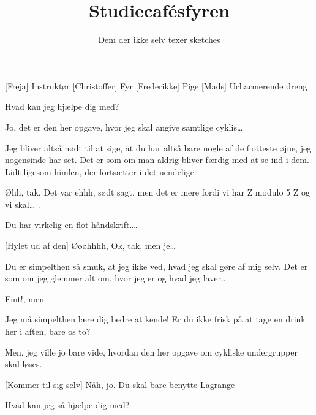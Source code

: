 \documentclass[a4paper,11pt]{article}
\title{Studiecafésfyren}
\author{Dem der ikke selv texer sketches}
\begin{document}
\maketitle

\begin{roles}
[Freja] Instruktør
[Christoffer] Fyr
[Frederikke] Pige
[Mads] Ucharmerende dreng
\end{roles}

\begin{props}
\prop{}
\end{props}


\begin{sketch}


 Hvad kan jeg hjælpe dig med?

 Jo, det er den her opgave, hvor jeg skal angive samtlige cyklis… 

  Jeg bliver altså nødt til at sige, at du har altså bare nogle af de flotteste øjne, jeg nogensinde har set. Det er som om man aldrig bliver færdig med at se ind i dem. Lidt ligesom himlen, der fortsætter i det uendelige. 

 Øhh, tak. Det var ehhh, sødt sagt, men  det er mere fordi vi har Z modulo 5 Z og vi skal… .

 Du har virkelig en flot håndskrift…. 

[Hylet ud af den] Øøøhhhh, Ok, tak, men je… 

 Du er simpelthen så smuk, at jeg ikke ved, hvad jeg skal gøre af mig selv. Det er som om jeg glemmer alt om, hvor jeg er og hvad jeg laver..

 Fint!, men 

 Jeg må simpelthen lære dig bedre at kende! Er du ikke frisk på at tage en drink her i aften, bare os to?

 Men, jeg ville jo bare vide, hvordan den her opgave om cykliske undergrupper skal løses.

[Kommer til sig selv] Nåh, jo. Du skal bare benytte Lagrange 


 Hvad kan jeg så hjælpe dig med?



\end{sketch}
\end{document}
